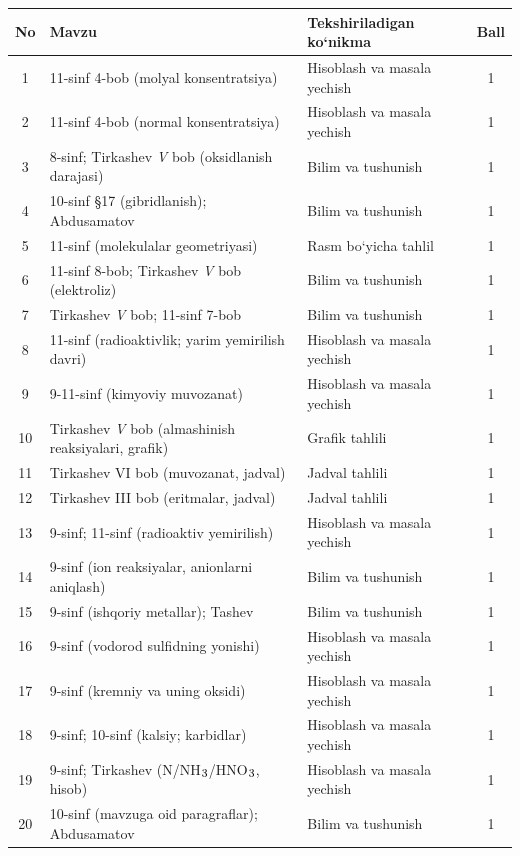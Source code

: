 \documentclass[11pt,a4paper]{article}
\renewcommand{\textsubscript}[1]{\ensuremath{_{\text{\fontsize{8}{8}\selectfont #1}}}}
\begin{document}
{\small\noindent\begin{longtable}{|c|p{7.2cm}|p{5.4cm}|c|}\hline \textbf{No} & \textbf{Mavzu} & \textbf{Tekshiriladigan ko`nikma} & \textbf{Ball}\\\hline
1 & 11-sinf 4-bob (molyal konsentratsiya) & Hisoblash va masala yechish & 1\\\hline
2 & 11-sinf 4-bob (normal konsentratsiya) & Hisoblash va masala yechish & 1\\\hline
3 & 8-sinf; Tirkashev \textit{V} bob (oksidlanish darajasi) & Bilim va tushunish & 1\\\hline
4 & 10-sinf \S{}17 (gibridlanish); Abdusamatov & Bilim va tushunish & 1\\\hline
5 & 11-sinf (molekulalar geometriyasi) & Rasm bo`yicha tahlil & 1\\\hline
6 & 11-sinf 8-bob; Tirkashev \textit{V} bob (elektroliz) & Bilim va tushunish & 1\\\hline
7 & Tirkashev \textit{V} bob; 11-sinf 7-bob & Bilim va tushunish & 1\\\hline
8 & 11-sinf (radioaktivlik; yarim yemirilish davri) & Hisoblash va masala yechish & 1\\\hline
9 & 9-11-sinf (kimyoviy muvozanat) & Hisoblash va masala yechish & 1\\\hline
10 & Tirkashev \textit{V} bob (almashinish reaksiyalari, grafik) & Grafik tahlili & 1\\\hline
11 & Tirkashev VI bob (muvozanat, jadval) & Jadval tahlili & 1\\\hline
12 & Tirkashev III bob (eritmalar, jadval) & Jadval tahlili & 1\\\hline
13 & 9-sinf; 11-sinf (radioaktiv yemirilish) & Hisoblash va masala yechish & 1\\\hline
14 & 9-sinf (ion reaksiyalar, anionlarni aniqlash) & Bilim va tushunish & 1\\\hline
15 & 9-sinf (ishqoriy metallar); Tashev & Bilim va tushunish & 1\\\hline
16 & 9-sinf (vodorod sulfidning yonishi) & Hisoblash va masala yechish & 1\\\hline
17 & 9-sinf (kremniy va uning oksidi) & Hisoblash va masala yechish & 1\\\hline
18 & 9-sinf; 10-sinf (kalsiy; karbidlar) & Hisoblash va masala yechish & 1\\\hline
19 & 9-sinf; Tirkashev (N/NH\textsubscript{3}/HNO\textsubscript{3}, hisob) & Hisoblash va masala yechish & 1\\\hline
20 & 10-sinf (mavzuga oid paragraflar); Abdusamatov & Bilim va tushunish & 1\\\hline

\end{longtable}}
\end{document}
